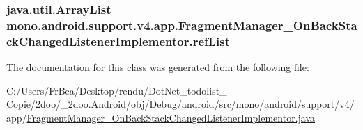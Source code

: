 \hypertarget{classmono_1_1android_1_1support_1_1v4_1_1app_1_1_fragment_manager___on_back_stack_changed_listener_implementor_5674b8c868a8fbe1ca3adfd0affdd9c1}{
\subsubsection[{refList}]{\setlength{\rightskip}{0pt plus 5cm}java.util.ArrayList {\bf mono.android.support.v4.app.FragmentManager\_\-OnBackStackChangedListenerImplementor.refList}}}
\label{classmono_1_1android_1_1support_1_1v4_1_1app_1_1_fragment_manager___on_back_stack_changed_listener_implementor_5674b8c868a8fbe1ca3adfd0affdd9c1}




The documentation for this class was generated from the following file:\begin{CompactItemize}
\item 
C:/Users/FrBea/Desktop/rendu/DotNet\_\-todolist\_ - Copie/2doo/\_\-2doo.Android/obj/Debug/android/src/mono/android/support/v4/app/\hyperlink{_fragment_manager___on_back_stack_changed_listener_implementor_8java}{FragmentManager\_\-OnBackStackChangedListenerImplementor.java}\end{CompactItemize}

